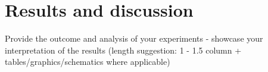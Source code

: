 \section{Results and discussion}
\label{sec:results}

Provide the outcome and analysis of your experiments - showcase your interpretation of the results (length suggestion: 1 - 1.5 column + tables/graphics/schematics where applicable)

